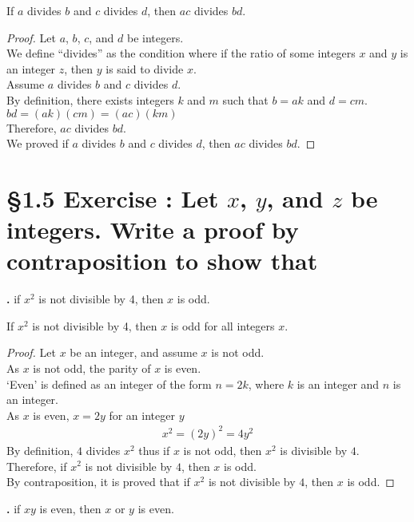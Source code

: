 \documentclass[a4paper,11pt]{article}
\begin{document}
\begin{theorem4}
If \(a\) divides \(b\) and \(c\) divides \(d\), then \(ac\) divides \(bd\).
\begin{proof}
Let \(a\), \(b\), \(c\), and \(d\) be integers.\\
We define ``divides'' as the condition where if the ratio of some integers \(x\) and \(y\) is an integer \(z\), then \(y\) is said to divide \(x\).\\
Assume \(a\) divides \(b\) and \(c\) divides \(d\).\\
By definition, there exists integers \(k\) and \(m\) such that \(b=ak\) and \(d=cm\).\\
\(bd = (ak)(cm) = (ac)(km)\)\\
Therefore, \(ac\) divides \(bd\).\\
We proved if \(a\) divides \(b\) and \(c\) divides \(d\), then \(ac\) divides \(bd\).
\end{proof}
\end{theorem4}
\newpage

\setcounter{ProblemCounter}{3}
\setcounter{SubsectionCounter}{3}
\section*{\S 1.5 Exercise : Let \( x\), \( y\), and \(z\) be integers. Write a proof by contraposition to show that }
\textbf{.}
if \(x^2\) is not divisible by 4, then \(x\) is odd.

\begin{theorem5}
If \(x^2\) is not divisible by 4, then \(x\) is odd for all integers \(x\).
\begin{proof}
Let \(x\) be an integer, and assume \(x\) is not odd.\\
As \(x\) is not odd, the parity of \(x\) is even.\\
`Even' is defined as an integer of the form \(n = 2k\), where \(k\) is an 
integer and \(n\) is an integer.\\
As \(x\) is even, \(x=2y\) for an integer \(y\)
\begin{gather*}
x^2 = {(2y)}^2 = 4y^2
\end{gather*}
By definition, \(4\) divides \(x^2\) thus if \(x\) is not odd, then \(x^2\) is 
divisible by \(4\).\\
Therefore, if \(x^2\) is not divisible by \(4\), then \(x\) is odd.\\
By contraposition, it is proved that if \(x^2\) is not divisible by \(4\), then \(x\) 
is odd.
\end{proof}
\end{theorem5}
\setcounter{SubsectionCounter}{3}
\noindent\textbf{.}
if \(xy\) is even, then \(x\) or \(y\) is even.
\end{document}
